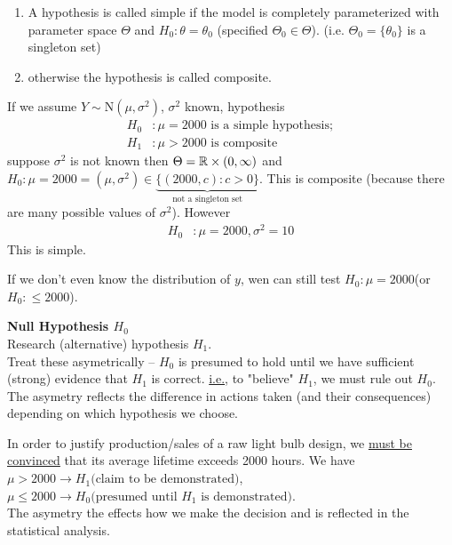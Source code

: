 \documentclass[english, 11pt]{article}
\begin{document}
\begin{defn}\label{defn:53}
\begin{enumerate}
\item A hypothesis is called simple if the model is completely parameterized with parameter space $\Theta$ and $H_0:\theta=\theta_0$ (specified $\Theta_0\in\Theta$). (i.e. $\Theta_0=\{\theta_0\}$ is a singleton set)
\item otherwise the hypothesis is called composite.
\end{enumerate}
\end{defn}

\begin{exmp}
If we assume $Y\sim\text{N}(\mu, \sigma^2)$, $\sigma^2$ known, hypothesis
$$
\begin{aligned}
H_0&:\mu=2000 \text{ is a simple hypothesis};\\
H_1&:\mu>2000 \text{ is composite}
\end{aligned}
$$
suppose $\sigma^2$ is not known then $\Theta={\mathbb{R}}\times(0, \infty)$ and $H_0:\mu=2000=(\mu, \sigma^2)\in\underbrace{\{(2000, c):c>0\}}_{\text{not a singleton set}}$. This is composite (because there are many possible values of $\sigma^2$). However 
$$
\begin{aligned}
H_0&:\mu=2000, \sigma^2=10
\end{aligned}
$$
This is simple.

If we don't even know the distribution of $y$, wen can still test $H_0:\mu=2000$(or $H_0:\leqslant2000$).
\end{exmp}

\textbf{Null Hypothesis $H_0$}\\
Research (alternative) hypothesis $H_1$.\\
Treat these asymetrically -- $H_0$ is presumed to hold until we have sufficient (strong) evidence  that $H_1$ is correct. \underline{i.e.}, to "believe" $H_1$, we must rule out $H_0$. The asymetry reflects the difference in actions taken (and their consequences) depending on which hypothesis we choose.

\begin{exmp}
In order to justify production/sales of a raw light bulb design, we \underline{must be convinced} that its average lifetime exceeds 2000 hours.
We have $\mu>2000\rightarrow H_1(\text{claim to be demonstrated)}$, $\mu\leqslant2000\rightarrow H_0(\text{presumed until $H_1$ is demonstrated)}$. \\
The asymetry the effects how we make the decision and is reflected in the statistical analysis.
\end{exmp}
\end{document}
